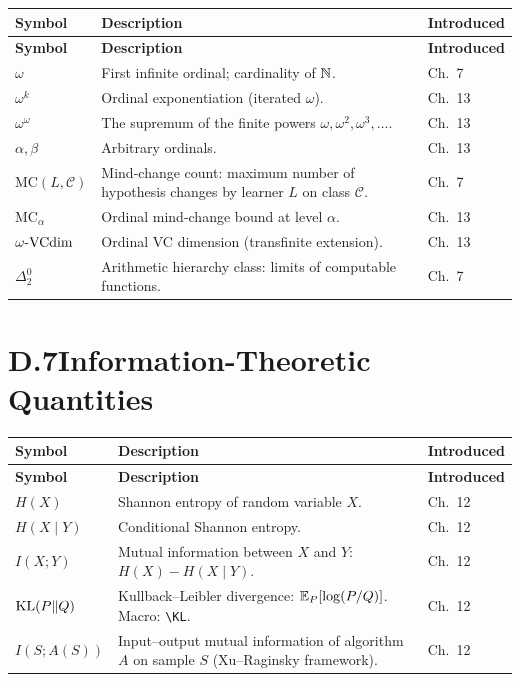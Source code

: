 \begin{longtable}{lp{7.5cm}l}
\toprule
\textbf{Symbol} & \textbf{Description} & \textbf{Introduced} \\
\midrule
\endfirsthead
\toprule
\textbf{Symbol} & \textbf{Description} & \textbf{Introduced} \\
\midrule
\endhead
\bottomrule
\endlastfoot
$\omega$ & First infinite ordinal; cardinality of $\mathbb{N}$. & Ch.~7 \\
$\omega^k$ & Ordinal exponentiation (iterated $\omega$). & Ch.~13 \\
$\omega^\omega$ & The supremum of the finite powers $\omega, \omega^2, \omega^3, \ldots$. & Ch.~13 \\
$\alpha, \beta$ & Arbitrary ordinals. & Ch.~13 \\
$\mathrm{MC}(L, \mathcal{C})$ & Mind-change count: maximum number of hypothesis changes by learner $L$ on class $\mathcal{C}$. & Ch.~7 \\
$\mathrm{MC}_\alpha$ & Ordinal mind-change bound at level $\alpha$. & Ch.~13 \\
$\omega\text{-}\mathrm{VCdim}$ & Ordinal VC dimension (transfinite extension). & Ch.~13 \\
$\Delta^0_2$ & Arithmetic hierarchy class: limits of computable functions. & Ch.~7 \\
\end{longtable}

\section*{D.7\quad Information-Theoretic Quantities}
\label{sec:notation-info}

\begin{longtable}{lp{7.5cm}l}
\toprule
\textbf{Symbol} & \textbf{Description} & \textbf{Introduced} \\
\midrule
\endfirsthead
\toprule
\textbf{Symbol} & \textbf{Description} & \textbf{Introduced} \\
\midrule
\endhead
\bottomrule
\endlastfoot
$H(X)$ & Shannon entropy of random variable $X$. & Ch.~12 \\
$H(X \mid Y)$ & Conditional Shannon entropy. & Ch.~12 \\
$I(X; Y)$ & Mutual information between $X$ and $Y$: $H(X) - H(X \mid Y)$. & Ch.~12 \\
$\mathrm{KL}(P \| Q)$ & Kullback--Leibler divergence: $\mathbb{E}_P[\log(P/Q)]$. Macro: \verb|\KL|. & Ch.~12 \\
$I(S; A(S))$ & Input--output mutual information of algorithm $A$ on sample $S$ (Xu--Raginsky framework). & Ch.~12 \\
\end{longtable}

